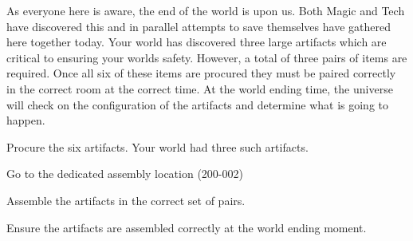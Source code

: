 \documentclass[green]{guildcamp3}
\begin{document}
\name{\gSaveWorld{}}




As everyone here is aware, the end of the world is upon us. Both Magic and Tech have discovered this and in parallel attempts to save themselves have gathered here together today. Your world has discovered three large artifacts which are critical to ensuring your worlds safety. However, a total of three pairs of items are required. Once all six of these items are procured they must be paired correctly in the correct room at the correct time. At the world ending time, the universe will check on the configuration of the artifacts and determine what is going to happen.

\begin{enum}[Directions]
  \item Procure the six artifacts. Your world had three such artifacts.  
  \item Go to the dedicated assembly location (200-002)
  \item Assemble the artifacts in the correct set of pairs.
  \item Ensure the artifacts are assembled correctly at the world ending moment. 
\end{enum}
\end{document}
